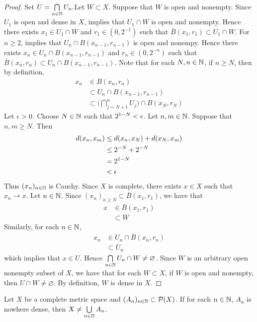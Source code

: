 \documentclass{book}
\begin{document}
\begin{proof}
	Set $U =  \bigcap\limits_{n \in \mathbb{N}} U_n. $Let $W \subset X$. Suppose that $W$ is open and nonempty. Since $U_1$ is open and dense in $X$,  implies that $U_1 \cap W$ is open and nonempty. Hence there exists $x_1 \in U_1 \cap W$ and $r_1 \in (0, 2^{-1})$ such that $\bar{B}(x_1, r_1) \subset U_1 \cap W$. For $n \geq 2$,  implies that $U_n \cap B(x_{n-1}, r_{n-1})$ is open and nonempy. Hence there exists $x_n \in U_n \cap B(x_{n-1}, r_{n-1})$ and $r_n \in (0, 2^{-n})$ such that $\bar{B}(x_n, r_n) \subset U_n \cap B(x_{n-1}, r_{n-1})$. Note that for each $N,n \in \mathbb{N}$, if $n \geq N$, then by definition,
	\begin{align*}
		x_n 
		& \in B(x_n, r_n) \\
		& \subset U_n \cap B(x_{n-1}, r_{n-1}) \\
		& \subset \bigg( \bigcap_{j=N+1}^{n} U_j \bigg) \cap B(x_N, r_N)
	\end{align*}
	Let $\epsilon > 0$. Choose $N \in \mathbb{N}$ such that $2^{1-N} < \epsilon$. Let $n, m \in \mathbb{N}$. Suppose that $n, m \geq N$. Then 
	\begin{align*}
		d(x_n, x_m)
		& \leq d(x_n, x_N) + d(x_N, x_m) \\
		& \leq 2^{-N} + 2^{-N} \\
		& = 2^{1-N} \\
		& < \epsilon 
	\end{align*}
	Thus $(x_n)_{n \in \mathbb{N}}$ is Cauchy. Since $X$ is complete, there exists $x \in X$ such that $x_n \rightarrow x$. Let $n \in \mathbb{N}$. Since $(x_n)_{n \geq N} \subset \bar{B}(x_1, r_1)$, we have that 
	\begin{align*}
		x 
		& \in \bar{B}(x_1, r_1) \\
		& \subset W
	\end{align*}
	Similarly, for each $n \in \mathbb{N}$,
	\begin{align*}
		x_n 
		& \in U_n \cap \bar{B}(x_n, r_n) \\
		& \subset U_n
	\end{align*}
	which implies that $x \in U$. Hence $\bigcap\limits_{n \in \mathbb{N}} U_n \cap W \neq \varnothing$. Since $W$ is an arbitrary open nonempty subset of $X$, we have that for each $W \subset X$, if $W$ is open and nonempty, then $ U \cap W \neq \varnothing$. By definition, $W$ is dense in $X$.
\end{proof}

\begin{ex} 
	Let $X$ be a complete metric space and $(A_n)_{n \in \mathbb{N}} \subset \mathcal{P}(X)$. If for each $n \in \mathbb{N}$, $A_n$ is nowhere dense, then $X \neq \bigcup\limits_{n \in \mathbb{N}} A_n$.   
\end{ex}
\end{document}
